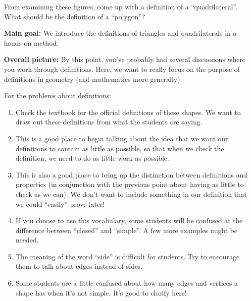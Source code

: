\documentclass[nooutcomes,noauthor]{ximera}
\begin{document}
\begin{problem}
From examining these figures, come up with a definition of a ``quadrilateral''.  What should be the definition of a ``polygon''?

\end{problem}



\pagebreak
\begin{instructorNotes}

{\bf Main goal:} We  introduce the definitions of triangles and quadrilaterals in a hands-on method.

{\bf Overall picture:} By this point, you've probably had several discussions where you work through definitions.  Here, we want to really focus on the purpose of definitions in geometry (and mathematics more generally).




For the problems about definitions:
\begin{enumerate}
\item Check the textbook for the official definitions of these shapes. We want to draw out these definitions from what the students are saying.
\item This is a good place to begin talking about the idea that we want our definitions to contain as little as possible, so that when we check the definition, we need to do as little work as possible.
\item This is also a good place to bring up the distinction between definitions and properties (in conjunction with the previous point about having as little to check as we can). We don't want to include something in our definition that we could ``easily'' prove later!
\item If you choose to use this vocabulary, some students will be confused at the difference between ``closed'' and ``simple''.  A few more examples might be needed.
\item The meaning of the word ``side'' is difficult for students.  Try to encourage them to talk about edges instead of sides.  
\item Some students are a little confused about how many edges and vertices a shape has when it's not simple.  It's good to clarify here!
\end{enumerate}



\end{instructorNotes}
\end{document}

